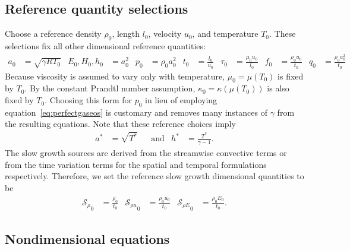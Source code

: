 \documentclass[letterpaper,11pt,nointlimits,reqno,draft]{amsbook}
\newcommand{\Ssd}{\ensuremath{\mathcal{S}}} %
\begin{document}
\subsection{Reference quantity selections}
\label{sec:nondimrefq}

Choose a reference density $\rho_{0}$, length $l_{0}$, velocity $u_{0}$, and
temperature $T_{0}$.  These selections fix all other dimensional reference
quantities:
\begin{align}
  a_{0} &= \sqrt{\gamma{}RT_{0}}
  &
  E_{0}, H_{0}, h_{0} &= a_{0}^{2}
  &
  p_{0} &= \rho_{0} a_{0}^{2}
  &
  t_{0} &= \frac{l_{0}}{u_{0}}
  &
  \tau_{0} &= \frac{\mu_{0}u_{0}}{l_{0}}
  &
  f_{0} &= \frac{\rho_{0}u_{0}}{t_{0}}
  &
  q_{0} &= \frac{\rho_{0}a_{0}^{2}}{t_{0}}
\end{align}
Because viscosity is assumed to vary only with temperature,
$\mu_{0}=\mu\!\left( T_{0} \right)$ is fixed by $T_{0}$.  By the constant
Prandtl number assumption, $\kappa_{0}=\kappa\!\left( \mu\!\left( T_{0} \right)
\right)$ is also fixed by $T_{0}$.  Choosing this form for $p_{0}$ in lieu of
employing equation~\eqref{eq:perfectgaseos} is customary and removes many
instances of $\gamma$ from the resulting equations.  Note that these reference
choices imply
\begin{align}
a^{*}&=\sqrt{T^{*}}
&
&\text{and}
&
h^{*}&=\frac{T^{*}}{\gamma-1}
.
\end{align}
The slow growth sources are derived from the streamwise convective terms or
from the time variation terms for the spatial and temporal formulations
respectively. Therefore, we set the reference slow growth dimensional quantities
to be
\begin{align}
  {\Ssd_{\rho}}_0 &= \frac{\rho_{0}}{t_0}
  &
  {\Ssd_{\rho u}}_0 &= \frac{\rho_{0} u_0}{t_0}
  &
  {\Ssd_{\rho E}}_0 &= \frac{\rho_{0} E_0}{t_0}.
\end{align}


\subsection{Nondimensional equations}
\label{nondim_equations}
\end{document}

